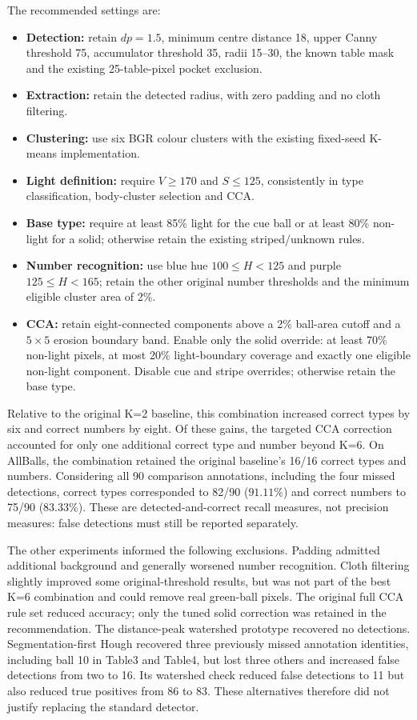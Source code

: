 The recommended settings are:
\begin{itemize}
\item \textbf{Detection:} retain $dp=1.5$, minimum centre distance 18,
upper Canny threshold 75, accumulator threshold 35, radii 15--30,
the known table mask and the existing 25-table-pixel pocket exclusion.
\item \textbf{Extraction:} retain the detected radius, with zero padding
and no cloth filtering.
\item \textbf{Clustering:} use six BGR colour clusters with the existing
fixed-seed K-means implementation.
\item \textbf{Light definition:} require $V\geq170$ and $S\leq125$,
consistently in type classification, body-cluster selection and CCA.
\item \textbf{Base type:} require at least 85\% light for the cue ball
or at least 80\% non-light for a solid; otherwise retain the existing
striped/unknown rules.
\item \textbf{Number recognition:} use blue hue $100\leq H<125$
and purple $125\leq H<165$; retain the other original number thresholds
and the minimum eligible cluster area of 2\%.
\item \textbf{CCA:} retain eight-connected components above a 2\%
ball-area cutoff and a $5\times5$ erosion boundary band. Enable only
the solid override: at least 70\% non-light pixels, at most 20\%
light-boundary coverage and exactly one eligible non-light component.
Disable cue and stripe overrides; otherwise retain the base type.
\end{itemize}

Relative to the original K=2 baseline, this combination increased correct
types by six and correct numbers by eight. Of these gains, the targeted
CCA correction accounted for only one additional correct type and number
beyond K=6. On AllBalls, the combination retained the original baseline's
16/16 correct types and numbers. Considering all 90 comparison annotations,
including the four missed detections, correct types corresponded to 82/90
($91.11\%$) and correct numbers to 75/90 ($83.33\%$). These are
detected-and-correct recall measures, not precision measures: false
detections must still be reported separately.

The other experiments informed the following exclusions. Padding admitted
additional background and generally worsened number recognition. Cloth
filtering slightly improved some original-threshold results, but was not
part of the best K=6 combination and could remove real green-ball pixels.
The original full CCA rule set reduced accuracy; only the tuned solid
correction was retained in the recommendation. The distance-peak watershed
prototype recovered no detections. Segmentation-first Hough recovered
three previously missed annotation identities, including ball 10 in
Table3 and Table4, but lost three others and increased false detections
from two to 16. Its watershed check reduced false detections to 11 but
also reduced true positives from 86 to 83. These alternatives therefore
did not justify replacing the standard detector.

